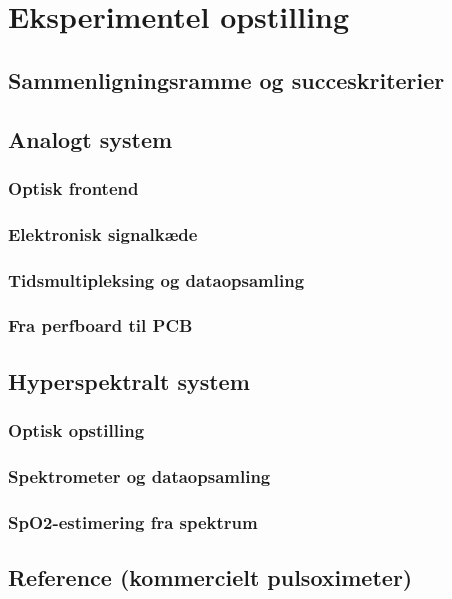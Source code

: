 \chapter{Eksperimentel opstilling}

\section{Sammenligningsramme og succeskriterier}



\section{Analogt system}



\subsection{Optisk frontend}



\subsection{Elektronisk signalkæde}
\subsection{Tidsmultipleksing og dataopsamling}
\subsection{Fra perfboard til PCB}

\section{Hyperspektralt system}
\subsection{Optisk opstilling}
\subsection{Spektrometer og dataopsamling}
\subsection{SpO2-estimering fra spektrum}

\section{Reference (kommercielt pulsoximeter)}




